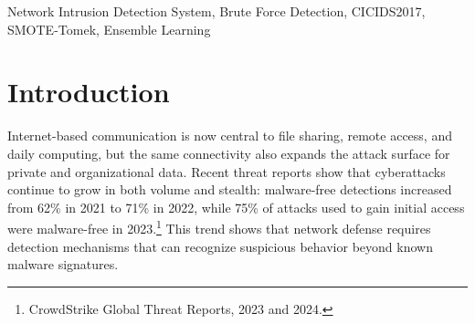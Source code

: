 \documentclass[conference,a4paper]{IEEEtran}
\begin{document}
\maketitle

\begin{abstract}
Machine-learning-based Network Intrusion Detection Systems (NIDS) are widely used to detect malicious traffic, but their performance can degrade when attack classes are underrepresented. Previous studies have attempted to mitigate this through feature selection, sampling, and ensemble learning. However, this components are often failing to adequately address minority attacks. In dataset like CICIDS2017, Brute Force traffic remains difficult to detect because repeated authentication attempts closely resemble benign activity. This study focuses on Brute Force detection in the imbalanced CICIDS2017 dataset using a hybrid sampling and ensemble-learning pipeline. The proposed workflow maps CICIDS2017 labels into eight multiclass categories, limits the dominant Benign class, cleans invalid records, performs train-only feature selection using ANOVA \textit{SelectKBest} and correlation pruning, and applies SMOTE-Tomek only to the training partition. Two heterogeneous ensembles, soft voting and stacking, are then evaluated on an unseen test set. SMOTE-Tomek increased Brute Force training representation from 5,204 to 76,385 samples and reduced its imbalance ratio from 30.30:1 to 2.06:1. On the test set, soft voting achieved 98.73\% Brute Force precision, 92.78\% recall, and 95.66\% F1-score, while stacking achieved 98.28\% precision, 93.16\% recall, and 95.65\% F1-score. The results show that hybrid sampling and ensemble learning provide a practical strategy for Brute Force detection, although generalization beyond CICIDS2017 remains limited.
\end{abstract}

\begin{IEEEkeywords}
Network Intrusion Detection System, Brute Force Detection, CICIDS2017, SMOTE-Tomek, Ensemble Learning
\end{IEEEkeywords}

\section{Introduction}

Internet-based communication is now central to file sharing, remote access, and daily computing, but the same connectivity also expands the attack surface for private and organizational data. Recent threat reports show that cyberattacks continue to grow in both volume and stealth: malware-free detections increased from 62\% in 2021 to 71\% in 2022, while 75\% of attacks used to gain initial access were malware-free in 2023.\footnote{CrowdStrike Global Threat Reports, 2023 and 2024.} This trend shows that network defense requires detection mechanisms that can recognize suspicious behavior beyond known malware signatures.
\end{document}
